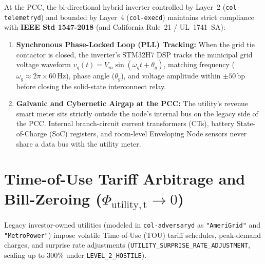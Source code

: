 At the PCC, the bi-directional hybrid inverter controlled by Layer~2 (\texttt{col-telemetryd}) and bounded by Layer~4 (\texttt{col-execd}) maintains strict compliance with \textbf{IEEE Std 1547-2018} (and California Rule~21 / UL~1741~SA):
\begin{enumerate}
    \item \textbf{Synchronous Phase-Locked Loop (PLL) Tracking:} When the grid tie contactor is closed, the inverter's STM32H7 DSP tracks the municipal grid voltage waveform $v_g(t) = V_m \sin(\omega_g t + \theta_g)$, matching frequency ($\omega_g \approx 2\pi \times 60\,\mathrm{Hz}$), phase angle ($\theta_g$), and voltage amplitude within $\pm 50\,\mathrm{bp}$ before closing the solid-state interconnect relay.
    \item \textbf{Galvanic and Cybernetic Airgap at the PCC:} The utility's revenue smart meter sits strictly outside the node's internal bus on the legacy side of the PCC. Internal branch-circuit current transformers (CTs), battery State-of-Charge (SoC) registers, and room-level Enveloping Node sensors never share a data bus with the utility meter.
\end{enumerate}

\section{Time-of-Use Tariff Arbitrage and Bill-Zeroing ($\Phi_{\mathrm{utility,t}} \to 0$)}
\label{sec:l7-tariff-arbitrage}

Legacy investor-owned utilities (modeled in \texttt{col-adversaryd} as \texttt{"AmeriGrid"} and \texttt{"MetroPower"}) impose volatile Time-of-Use (TOU) tariff schedules, peak-demand charges, and surprise rate adjustments (\texttt{UTILITY\_SURPRISE\_RATE\_ADJUSTMENT}, scaling up to $300\%$ under \texttt{LEVEL\_2\_HOSTILE}).

